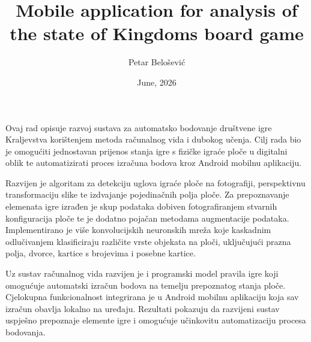 \documentclass[diplomskirad]{fer}
\title{Mobile application for analysis of the state of Kingdoms board game}
\author{Petar Belošević}
\date{June, 2026}
\begin{document}
\maketitle






\begin{zahvale}
\end{zahvale}


\mainmatter



\begin{sazetak}
	Ovaj rad opisuje razvoj sustava za automatsko bodovanje društvene igre Kraljevstva korištenjem metoda računalnog vida i dubokog učenja. Cilj rada bio je omogućiti jednostavan prijenos stanja igre s fizičke igraće ploče u digitalni oblik te automatizirati proces izračuna bodova kroz Android mobilnu aplikaciju.

	Razvijen je algoritam za detekciju uglova igraće ploče na fotografiji, perspektivnu transformaciju slike te izdvajanje pojedinačnih polja ploče. Za prepoznavanje elemenata igre izrađen je skup podataka dobiven fotografiranjem stvarnih konfiguracija ploče te je dodatno pojačan metodama augmentacije podataka. Implementirano je više konvolucijskih neuronskih mreža koje kaskadnim odlučivanjem klasificiraju različite vrste objekata na ploči, uključujući prazna polja, dvorce, kartice s brojevima i posebne kartice.
	
	Uz sustav računalnog vida razvijen je i programski model pravila igre koji omogućuje automatski izračun bodova na temelju prepoznatog stanja ploče. Cjelokupna funkcionalnost integrirana je u Android mobilnu aplikaciju koja sav izračun obavlja lokalno na uređaju. Rezultati pokazuju da razvijeni sustav uspješno prepoznaje elemente igre i omogućuje učinkovitu automatizaciju procesa bodovanja.
\end{sazetak}
\end{document}
